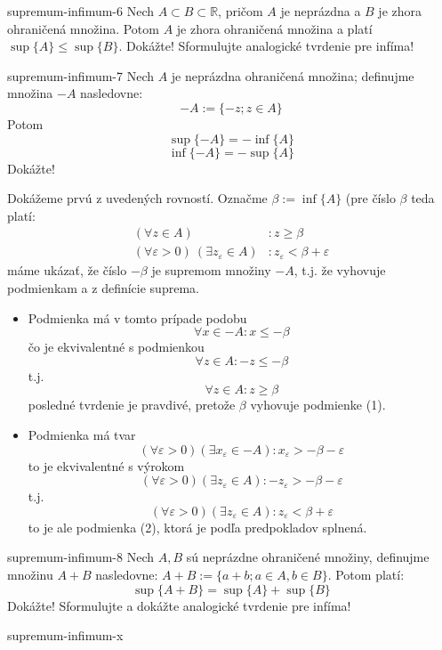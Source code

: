 \begin{defproblem}{supremum-infimum-6}
Nech $A \subset B \subset \mathbb{R}$, pričom $A$ je neprázdna a $B$ je zhora
ohraničená množina. Potom $A$ je zhora ohraničená množina a platí
$\sup\{A\} \leq \sup\{B\}$. Dokážte! Sformulujte analogické tvrdenie pre infíma!
\end{defproblem}

\begin{defproblem}{supremum-infimum-7}
Nech $A$ je neprázdna ohraničená množina; definujme množina $-A$ nasledovne:
$$-A := \{ -z; z \in A\}$$
Potom
$$\sup\{-A\} = -\inf\{A\}$$
$$\inf\{-A\} = -\sup\{A\}$$
Dokážte!

\begin{solution}
  Dokážeme prvú z uvedených rovností. Označme $\beta := \inf\{A\}$ (pre číslo
  $\beta$ teda platí:
  \begin{align*}
    (\forall z \in A)&: z \geq \beta \\
    (\forall \varepsilon > 0) \: (\exists z_\varepsilon \in A)&:
            z_\varepsilon < \beta + \varepsilon
  \end{align*}
  máme ukázať, že číslo $-\beta$ je supremom množiny $-A$, t.j. že vyhovuje
  podmienkam  a  z definície suprema.

  \begin{itemize}
    \item[\ding{34}]
      Podmienka má v tomto prípade podobu
      $$\forall x \in -A: x \leq -\beta$$
      čo je ekvivalentné s podmienkou
      $$\forall z \in A: -z \leq -\beta$$
      t.j.
      $$\forall z \in A: z \geq \beta$$
      posledné tvrdenie je pravdivé, pretože $\beta$ vyhovuje
      podmienke (1).
    \item[\ding{37}]
      Podmienka má tvar
      $$(\forall \varepsilon > 0) (\exists x_\varepsilon \in -A):
        x_\varepsilon > -\beta - \varepsilon$$
      to je ekvivalentné s výrokom
      $$(\forall \varepsilon > 0) (\exists z_\varepsilon \in A):
        -z_\varepsilon > -\beta - \varepsilon$$
      t.j.
      $$(\forall \varepsilon > 0) (\exists z_\varepsilon \in A):
        z_\varepsilon < \beta + \varepsilon$$
      to je ale podmienka (2), ktorá je podľa predpokladov splnená.
  \end{itemize}
\end{solution}

\end{defproblem}

\begin{defproblem}{supremum-infimum-8}
Nech $A, B$ sú neprázdne ohraničené množiny, definujme množinu $A + B$
nasledovne: $A + B := \{ a + b ; a \in A, b \in B \}$. Potom platí:
$$\sup\{A + B\} = \sup\{A\} + \sup\{B\}$$
Dokážte! Sformulujte a dokážte analogické tvrdenie pre infíma!
\end{defproblem}

\begin{defproblem}{supremum-infimum-x}
\end{defproblem}
